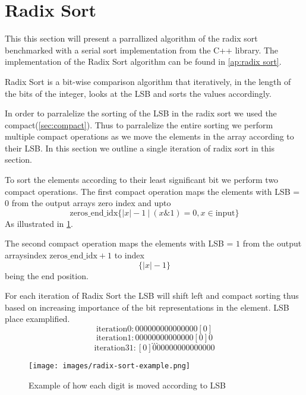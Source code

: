 \section{Radix Sort}
\label{sec:radix sort}

This this section will present a parrallized algorithm of the radix sort benchmarked with a serial sort implementation from the C++ library.
The implementation of the Radix Sort algorithm can be found in \cref{ap:radix sort}.

Radix Sort is a bit-wise comparison algorithm that iteratively, in the length of the bits of the integer, looks at the LSB and sorts the values accordingly.\cite{udacity}

In order to parralelize the sorting of the LSB in the radix sort we used the compact(\cref{sec:compact}).  
Thus to parralelize the entire sorting we perform multiple compact operations as we move the elements in the array according to their LSB.
In this section we outline a single iteration of radix sort in this section.

To sort the elements according to their least significant bit we perform two compact operations.
The first compact operation maps the elements with LSB = $0$ from the output arrays zero index and upto 
\[\mathrm{zeros\_end\_idx}\{|x|-1\ |\ (x\&1)=0, x \in \mathrm{input}\}\]
As illustrated in \cref{fig:radix sort example}.

The second compact operation maps the elements with LSB = $1$ from the output arraysindex $\mathrm{zeros\_end\_idx}+1$ to index \[\{|x|-1\}\] being the end position.  

For each iteration of Radix Sort the LSB will shift left and compact sorting thus based on increasing importance of the bit representations in the element.
LSB place examplified.
\[\mathrm{iteration 0:}0000 0000 0000 000[0]\]
\[\mathrm{iteration 1:}0000 0000 0000 00[0]0\]
\[ ... \]
\[\mathrm{iteration 31:}[0]000 0000 0000 0000\]

\begin{figure}[htb]
  \centering
  \texttt{[image: images/radix-sort-example.png]}
  \caption{Example of how each digit is moved according to LSB}
  \label{fig:radix sort example}
\end{figure}


